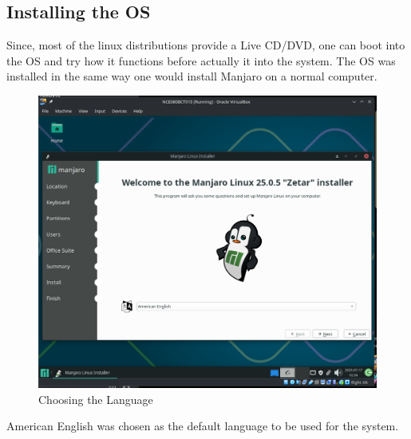 \documentclass[a4paper,12pt]{report}
\begin{document}
\subsection{Installing the OS}
Since, most of the linux distributions provide a Live CD/DVD, one can boot into the OS and try how it functions before actually it into the system.
\newline
The OS was installed in the same way one would install Manjaro on a normal computer.
\newline
\begin{figure}[h]
    \centering \includegraphics[width=0.6\linewidth]{install1.png}
    \caption{Choosing the Language}
    \label{fig10}
\end{figure}


American English was chosen as the default language to be used for the system. 
\end{document}
